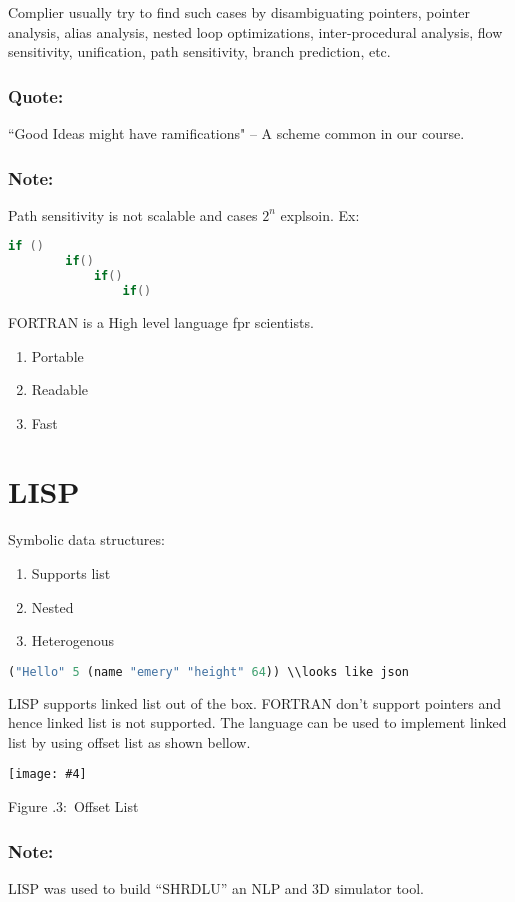 \documentclass[twoside]{article}
\newcounter{lecnum}
\newcommand{\fig}[4]{
            \centerline{\texttt{[image: \#4]}}
            \begin{center}
            Figure \thelecnum.#1:~#3
            \end{center}
    }
\begin{document}
Complier usually try to find such cases by disambiguating pointers, pointer analysis, alias analysis, nested loop optimizations, inter-procedural analysis, flow sensitivity, unification, path sensitivity, branch prediction, etc.

\subsubsection*{Quote:}
``Good Ideas might have ramifications" -- A scheme common in our course.

\subsubsection*{Note:}
    Path sensitivity is not scalable and cases $2^n$ explsoin. 
    Ex: 
\begin{lstlisting}[language=c++]
    if ()
        if()
            if()
                if() 
\end{lstlisting}
FORTRAN is a High level language fpr scientists.
\begin{enumerate}
    \item Portable
    \item Readable
    \item Fast
\end{enumerate}
\section{LISP}
Symbolic data structures:
\begin{enumerate}
    \item Supports list 
    \item Nested
    \item Heterogenous
\end{enumerate}
\begin{lstlisting}[language=lisp]
    ("Hello" 5 (name "emery" "height" 64)) \\looks like json
\end{lstlisting}
LISP supports linked list out of the box. FORTRAN don't support pointers and hence linked list is not supported. The language can be used to implement linked list by using offset list as shown bellow.
\fig{3}{0.6}{Offset List}{offsetlist.drawio.png}
\subsubsection*{Note:}
LISP was used to build ``SHRDLU'' an NLP and 3D simulator tool.
\end{document}
